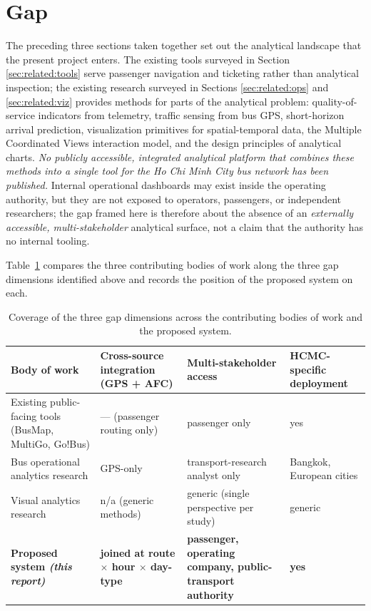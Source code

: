 \section{Gap}
\label{sec:related:gap}

The preceding three sections taken together set out the analytical landscape that the
present project enters. The existing tools surveyed in Section
\ref{sec:related:tools} serve passenger navigation and ticketing rather than analytical
inspection; the existing research surveyed in Sections \ref{sec:related:ops} and
\ref{sec:related:viz} provides methods for parts of the analytical problem:
quality-of-service indicators from telemetry, traffic sensing from bus GPS, short-horizon
arrival prediction, visualization primitives for spatial-temporal data, the Multiple
Coordinated Views interaction model, and the design principles of analytical charts.
\textit{No publicly accessible, integrated analytical platform that combines these
methods into a single tool for the Ho Chi Minh City bus network has been published.}
Internal operational dashboards may exist inside the operating authority, but they are
not exposed to operators, passengers, or independent researchers; the gap framed here is
therefore about the absence of an \emph{externally accessible, multi-stakeholder}
analytical surface, not a claim that the authority has no internal tooling.

Table~\ref{tab:related:gap} compares the three contributing bodies of work
along the three gap dimensions identified above and records the position
of the proposed system on each.

\begin{table}[!htbp]
\centering
\caption{Coverage of the three gap dimensions across the contributing bodies of work and the proposed system.}
\label{tab:related:gap}
\footnotesize
\renewcommand{\arraystretch}{1.3}
\begin{tabularx}{\linewidth}{p{4.6cm} X X X}
\hline
\textbf{Body of work} & \textbf{Cross-source integration (GPS + AFC)} & \textbf{Multi-stakeholder access} & \textbf{HCMC-specific deployment} \\
\hline
Existing public-facing tools (BusMap, MultiGo, Go!Bus)                & --- (passenger routing only)        & passenger only                                  & yes  \\
Bus operational analytics research \cite{srisakaokul2023,derevitskiy2016,linzeng2014} & GPS-only                            & transport-research analyst only                 & Bangkok, European cities  \\
Visual analytics research \cite{liu2022,knaflic2015,segelheer2010}    & n/a (generic methods)               & generic (single perspective per study)          & generic  \\
\textbf{Proposed system \textit{(this report)}}                       & \textbf{joined at route $\times$ hour $\times$ day-type} & \textbf{passenger, operating company, public-transport authority} & \textbf{yes}  \\
\hline
\end{tabularx}
\end{table}

